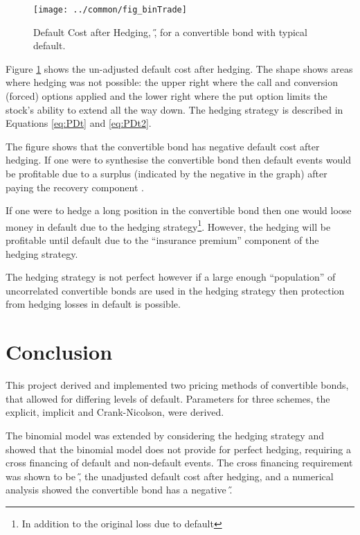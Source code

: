 \documentclass[a4paper,11pt,oneside]{report}
\theoremstyle{plain}
\theoremstyle{definition}
\begin{document}
\begin{figure}[htb!]
 \centering
 \texttt{[image: ../common/fig\_binTrade]}
 \caption[Default Cost after Hedging]{Default Cost after Hedging, \H, for a convertible bond with typical default.}
 \label{fig:binTrade}
\end{figure}

Figure \ref{fig:binTrade} shows the un-adjusted default cost after hedging.  The shape shows areas where hedging was not possible: the upper right where the call and conversion (forced) options applied and the lower right where the put option limits the stock's ability to extend all the way down.  The hedging strategy is described in Equations \ref{eq:PDt} and \ref{eq:PDt2}.

The figure shows that the convertible bond has negative default cost after hedging.  If one were to synthesise the convertible bond then default events would be profitable due to a surplus (indicated by the negative in the graph) after paying the recovery component \X.

If one were to hedge a long position in the convertible bond then one would loose money in default due to the hedging strategy\footnote{In addition to the original loss due to default}.  However, the hedging will be profitable until default due to the ``insurance premium'' component of the hedging strategy.

The hedging strategy is not perfect however if a large enough ``population'' of uncorrelated convertible bonds are used in the hedging strategy then protection from hedging losses in default is possible.


\chapter{Conclusion}
This project derived and implemented two pricing methods of convertible bonds, that allowed for differing levels of default.  Parameters for three schemes, the explicit, implicit and Crank-Nicolson, were derived.

The binomial model was extended by considering the hedging strategy and showed that the binomial model does not provide for perfect hedging, requiring a cross financing of default and non-default events.  The cross financing requirement was shown to be \H, the unadjusted default cost after hedging, and a numerical analysis showed the convertible bond has a negative \H.
\end{document}
